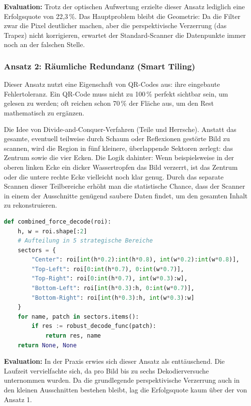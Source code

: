 \documentclass[
    a4paper,        %
    11pt,           %
    ngerman,        %
    parskip=half,   %
    listof=totoc,   %
    bibliography=totoc %
]{scrartcl}
\begin{document}
\textbf{Evaluation:} Trotz der optischen Aufwertung erzielte dieser Ansatz lediglich eine Erfolgsquote von 22,3\,\%. Das Hauptproblem bleibt die Geometrie: Da die Filter zwar die Pixel deutlicher machen, aber die perspektivische Verzerrung (das Trapez) nicht korrigieren, erwartet der Standard-Scanner die Datenpunkte immer noch an der falschen Stelle.

\subsubsection{Ansatz 2: Räumliche Redundanz (Smart Tiling)}
Dieser Ansatz nutzt eine Eigenschaft von QR-Codes aus: ihre eingebaute Fehlertoleranz. Ein QR-Code muss nicht zu 100\,\% perfekt sichtbar sein, um gelesen zu werden; oft reichen schon 70\,\% der Fläche aus, um den Rest mathematisch zu ergänzen.

Die Idee von Divide-and-Conquer\grqq-Verfahren (Teile und Herrsche). Anstatt das gesamte, eventuell teilweise durch Schaum oder Reflexionen gestörte Bild zu scannen, wird die Region in fünf kleinere, überlappende Sektoren zerlegt: das Zentrum sowie die vier Ecken.
Die Logik dahinter: Wenn beispielsweise in der oberen linken Ecke ein dicker Wassertropfen das Bild verzerrt, ist das Zentrum oder die untere rechte Ecke vielleicht noch klar genug. Durch das separate Scannen dieser Teilbereiche erhöht man die statistische Chance, dass der Scanner in einem der Ausschnitte genügend saubere Daten findet, um den gesamten Inhalt zu rekonstruieren.

\begin{lstlisting}[language=Python, caption={Sektorale Aufteilung der ROI (Smart Tiling)}]
def combined_force_decode(roi):
    h, w = roi.shape[:2]
    # Aufteilung in 5 strategische Bereiche
    sectors = {
        "Center": roi[int(h*0.2):int(h*0.8), int(w*0.2):int(w*0.8)],
        "Top-Left": roi[0:int(h*0.7), 0:int(w*0.7)],
        "Top-Right": roi[0:int(h*0.7), int(w*0.3):w],
        "Bottom-Left": roi[int(h*0.3):h, 0:int(w*0.7)],
        "Bottom-Right": roi[int(h*0.3):h, int(w*0.3):w]
    }
    for name, patch in sectors.items():
        if res := robust_decode_func(patch):
            return res, name 
    return None, None
\end{lstlisting}

\textbf{Evaluation:} In der Praxis erwies sich dieser Ansatz als enttäuschend. Die Laufzeit vervielfachte sich, da pro Bild bis zu sechs Dekodierversuche unternommen wurden. Da die grundlegende perspektivische Verzerrung auch in den kleinen Ausschnitten bestehen bleibt, lag die Erfolgsquote kaum über der von Ansatz 1. 
\end{document}
